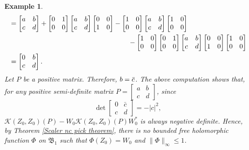 \documentclass[12pt]{amsart}%
\newtheorem{example}[theorem]{Example}
\numberwithin{equation}{section}
\newcommand{\fB}{{\mathfrak{B}}}
\newcommand{\clk}{\mathcal{K}}
\begin{document}
\begin{example}
\begin{align*}
\vspace{0.2cm}&= \begin{bmatrix}a&b\\c &d\end{bmatrix} +\begin{bmatrix}0&1\\0 &0\end{bmatrix} \begin{bmatrix}a&b\\c &d\end{bmatrix} \begin{bmatrix}0 &0\\1 &0\end{bmatrix}-\begin{bmatrix}1&0\\0 &0\end{bmatrix}\begin{bmatrix}a&b\\c &d\end{bmatrix} \begin{bmatrix}1&0\\0 &0\end{bmatrix}\\&\hspace{6.1cm}- \begin{bmatrix}1&0\\0 &0\end{bmatrix} \begin{bmatrix}0&1\\0 &0\end{bmatrix}\begin{bmatrix}a&b\\c &d\end{bmatrix} \begin{bmatrix}0&0\\1 &0\end{bmatrix}\begin{bmatrix}1&0\\0 &0\end{bmatrix}\\
&=\begin{bmatrix}0&b\\c &d\end{bmatrix}.
\end{align*}
\endgroup
Let $P$ be a positive matrix. Therefore, $b=\Bar{c}$. The above computation shows that, for any positive semi-definite matrix $P=\begin{bmatrix}a&b\\c &d\end{bmatrix}$, since $$\det \begin{bmatrix}0&\bar c\\c &d\end{bmatrix}=-|c|^2,$$  $\clk(Z_0, Z_0)(P)-W_0\clk(Z_0, Z_0)(P) W_0^*$ is always negative definite. Hence, by Theorem \ref{Scaler nc pick theorem}, there is no bounded free holomorphic function $\Phi$ on $\fB_1$ such that $\Phi(Z_0)=W_0$ and $\|\Phi\|_\infty\leq 1$.
\end{example}
\end{document}
